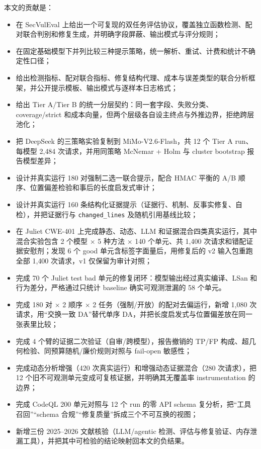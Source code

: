 \documentclass[conference]{IEEEtran}
\begin{document}
本文的贡献是：
\begin{itemize}
    \item 在 SecVulEval 上给出一个可复现的双任务评估协议，覆盖独立函数检测、配对联合判别和修复生成，并明确字段屏蔽、输出模式与评分规则；
    \item 在固定基础模型下并列比较三种提示策略，统一解析、重试、计费和统计不确定性口径；
    \item 给出检测指标、配对联合指标、修复结构代理、成本与误差类型的联合分析框架，并公开提示模板、输出模式与逐样本日志格式；
    \item 给出 Tier A/Tier B 的统一分层契约：同一套字段、失败分类、coverage/strict 和成本向量，但两个层级各自设主终点与外推边界，拒绝跨层池化；
    \item 把 DeepSeek 的三策略实验复制到 MiMo-V2.6-Flash，共 12 个 Tier A run、每模型 2{,}484 次请求，并用同策略 McNemar + Holm 与 cluster bootstrap 报告模型差异；
    \item 设计并真实运行 180 对强制二选一联合提示，配合 HMAC 平衡的 A/B 顺序、位置偏差检验和事后的长度启发式审计；
    \item 设计并真实运行 160 条结构化证据提示（证据行、机制、反事实修复、自检），并把证据行与 \texttt{changed\_lines} 及随机引用基线比较；
    \item 在 Juliet CWE-401 上完成静态、动态、LLM 和证据混合四类真实运行，其中混合实验包含 2 个模型 $\times$ 5 种方法 $\times$ 140 个单元、共 1{,}400 次请求和错配证据安慰剂；发现 6 个 good 单元含标签字面量后，用修复后的 v2 输入包重跑全部 1{,}400 次请求，v1 仅保留为审计对照；
    \item 完成 70 个 Juliet test bad 单元的修复闭环：模型输出经过真实编译、LSan 和行为差分，严格通过只统计 baseline 确实可观测泄漏的 58 个单元。
    \item 完成 180 对 $\times$ 2 顺序 $\times$ 2 任务（强制/开放）的配对去偏运行，新增 1{,}080 次请求，用“交换一致 DA”替代单序 DA，并把长度启发式与位置偏差放在同一张表里比较；
    \item 完成 4 个臂的证据二次验证（自审/跨模型），报告撤销的 TP/FP 构成、超几何检验、同预算随机/廉价规则对照与 fail-open 敏感性；
    \item 完成动态分析增强（420 次真实运行）和增强动态证据混合（280 次请求），把 12 个旧不可观测单元变成可复核证据，并明确其无覆盖率 instrumentation 的边界；
    \item 完成 CodeQL 200 单元对照与 12 个 run 的零 API schema 复分析，把“工具召回”“schema 合规”“修复质量”拆成三个不可互换的视图；
    \item 新增三份 2025--2026 文献核验（LLM/agentic 检测、评估与修复验证、内存泄漏工具），并把其中可检验的结论映射回本文的负结果。
\end{itemize}
\end{document}
